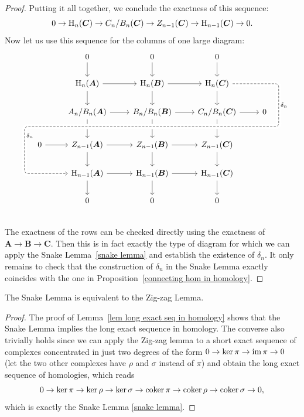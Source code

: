 \begin{proof}
    Putting it all together, we conclude the exactness of this sequence:
    \[0\to \mathrm{H}_n(\boldsymbol{C})\to C_n/B_n(\boldsymbol{C})\to Z_{n-1}(\boldsymbol{C})\to \mathrm{H}_{n-1}(\boldsymbol{C})\to 0.\]
    Now let us use this sequence for the columns of one large diagram:
    \[\begin{tikzcd}
        && 0\ar{d}& 0\ar{d} &0\ar{d} &&\\
        & & \rmH_n(\bm{A}) \ar{r} \ar{d} & \rmH_n(\bm{B})\ar{r} \ar{d} &  \rmH_n(\bm{C}) \ar{d}   %
        & & \\
        &  &  A_n/B_n(\bm{A}) \ar{r} & B_n/B_n(\bm{B}) \ar{r} \ar{dd} &  C_n/B_n(\bm{C})\ar{r}\ar{dd} & 0 &  ~\\[-10pt]
        & & &  ~ & & \ar[r, phantom, ""{coordinate, name=Y}] & ~\\[-10pt]
        ~&  \ar[l, phantom, ""{coordinate, name=Z}] 0 \ar{r} &  Z_{n-1}(\bm{A}) \ar[uu,leftarrow,crossing over]\ar{r} \ar{d} &  Z_{n-1}(\bm{B}) \ar{r} \ar{d} &  Z_{n-1}(\bm{C}) \ar{d} & &  \\
              & &  \ar[from=uuuurr, "\delta_n", dashed,crossing over, rounded corners,
                      to path=
                              { -- ([xshift=2ex]\tikztostart.east)
                              -| (Y) [near end]\tikztonodes
                              -| (Z) [near end]\tikztonodes
                              |- ([xshift=-2ex]\tikztotarget.west)
                               -- (\tikztotarget)}
                    ] \rmH_{n-1}(\bm{A})\ar{r}\ar{d}
               &  \rmH_{n-1}(\bm{B}) \ar{r}\ar{d}
               &  \rmH_{n-1}(\bm{C})\ar{d}
               & 
               & \\
        && 0& 0 &0 &&\\
    \end{tikzcd}\]
    The exactness of the rows can be checked directly using the exactness of $\bm{A}\to \bm{B}\to\bm{C}$. Then this is in fact exactly the type of diagram for which we can apply the Snake Lemma~\ref{snake lemma} and establish the existence of $\delta_n$. It only remains to check that the construction of $\delta_n$ in the Snake Lemma exactly coincides with the one in Proposition~\ref{connecting hom in homology}.
\end{proof}
\begin{cor}
    The Snake Lemma is equivalent to the Zig-zag Lemma.
\end{cor}
\begin{proof}
     The proof of Lemma~\ref{lem long exact seq in homology} shows that the Snake Lemma implies the long exact sequence in homology. The converse also trivially holds since we can apply the Zig-zag lemma to a short exact sequence of complexes concentrated in just two degrees of the form $0\to \ker\pi \to \operatorname{im}\pi \to 0$ (let the two other complexes have $\rho $ and $\sigma$ instead of $\pi$) and obtain the long exact sequence of homologies, which reads
    \[0\to \ker\pi \to \ker\rho\to \ker\sigma\to \operatorname{coker}\pi\to \operatorname{coker}\rho\to\operatorname{coker}\sigma\to 0, \]
    which is exactly the Snake Lemma \ref{snake lemma}.
\end{proof}


